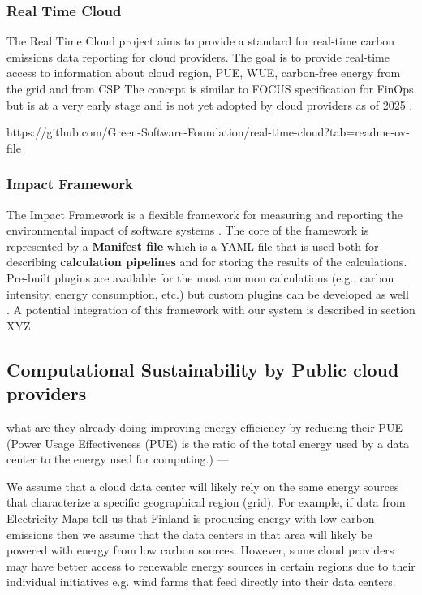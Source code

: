 \subsubsection{Real Time Cloud}

The Real Time Cloud project aims to provide a standard for real-time carbon emissions data reporting for cloud providers.
The goal is to provide real-time access to information about cloud region, PUE, WUE, carbon-free energy from the grid and from CSP
The concept is similar to FOCUS specification for FinOps but is at a very early stage and is not yet adopted by cloud providers as of 2025 \cite{real_time_cloud}.

https://github.com/Green-Software-Foundation/real-time-cloud?tab=readme-ov-file

\subsubsection{Impact Framework}

The Impact Framework is a flexible framework for measuring and reporting the environmental impact of software systems \cite{impact_framework}.
The core of the framework is represented by a \textbf{Manifest file} which is a YAML file that is used both for describing \textbf{calculation pipelines} and for storing the results of the calculations.
Pre-built plugins are available for the most common calculations (e.g., carbon intensity, energy consumption, etc.) but custom plugins can be developed as well \cite{impact_framework}.
A potential integration of this framework with our system is described in section XYZ.


\subsection{Computational Sustainability by Public cloud providers}

what are they already doing
improving energy efficiency by reducing their PUE
(Power Usage Effectiveness (PUE) is the ratio of the total energy used by a data center to the energy used for computing.)
---

We assume that a cloud data center will likely rely on the same energy sources that characterize a specific geographical region (grid).
For example, if data from Electricity Maps tell us that Finland is producing energy with low carbon emissions then we assume that the data centers in that area will likely be powered with energy from low carbon sources.
However, some cloud providers may have better access to renewable energy sources in certain regions due to their individual initiatives e.g. wind farms that feed directly into their data centers.


